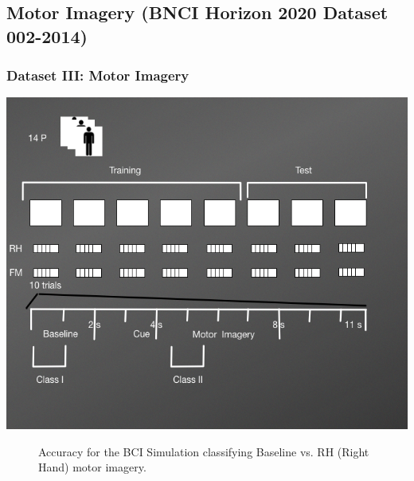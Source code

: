 \documentclass[11pt]{beamer}
\begin{document}
    \subsection{Motor Imagery (BNCI Horizon 2020 Dataset 002-2014)} 	
	\begin{frame}
	  \frametitle{Dataset III: Motor Imagery }
       \includegraphics[scale=0.38]{img/DatasetIIIDiagram2}    
    \end{frame}
   
   
   \begin{frame}   
   \begin{figure}[thpb]
      \centering
      \setlength\fboxsep{0pt}
	  \setlength\fboxrule{0.5pt}
      \caption{\centering Accuracy for the BCI Simulation classifying Baseline vs. RH (Right Hand) motor imagery.}
      \label{figure3}
   \end{figure} 	
	\end{frame}	  
	
\end{document}
